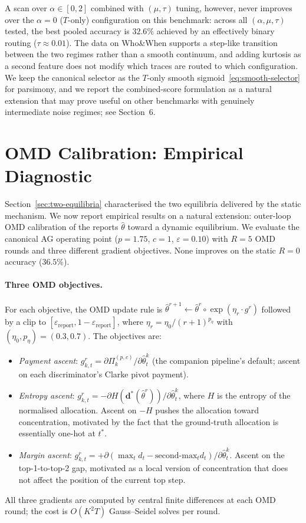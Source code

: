 \documentclass[11pt]{article}
\newcommand{\thetahat}{\hat{\theta}}
\newcommand{\db}{\bm{d}}
\begin{document}
A scan over $\alpha \in [0, 2]$ combined with $(\mu, \tau)$ tuning,
however, never improves over the $\alpha = 0$ ($T$-only) configuration on
this benchmark: across all $(\alpha, \mu, \tau)$ tested, the best pooled
accuracy is $32.6\%$ achieved by an effectively binary routing
($\tau \approx 0.01$). The data on Who\&When supports a step-like
transition between the two regimes rather than a smooth continuum, and
adding kurtosis as a second feature does not modify which traces are
routed to which configuration. We keep the canonical selector as the
$T$-only smooth sigmoid~\eqref{eq:smooth-selector} for parsimony, and we
report the combined-score formulation as a natural extension that may
prove useful on other benchmarks with genuinely intermediate noise
regimes; see Section~6.

\section{OMD Calibration: Empirical Diagnostic}
\label{sec:omd-diagnostic}

Section~\ref{sec:two-equilibria} characterised the two equilibria delivered
by the static mechanism. We now report empirical results on a natural
extension: outer-loop OMD calibration of the reports $\thetahat$ toward a
dynamic equilibrium. We evaluate the canonical AG operating point
($p = 1.75$, $c = 1$, $\varepsilon = 0.10$) with $R = 5$ OMD rounds and
three different gradient objectives. None improves on the static
$R = 0$ accuracy ($36.5\%$).

\paragraph{Three OMD objectives.}
For each objective, the OMD update rule is
$\thetahat^{r+1} \gets \thetahat^r \circ \exp(\eta_r \cdot g^r)$
followed by a clip to $[\varepsilon_{\text{report}}, 1 - \varepsilon_{\text{report}}]$,
where $\eta_r = \eta_0 / (r+1)^{p_\eta}$ with $(\eta_0, p_\eta) = (0.3, 0.7)$.
The objectives are:
\begin{itemize}[nosep, leftmargin=*]
\item \emph{Payment ascent}: $g^r_{k, t} = \partial \Pi_k^{(p, c)} / \partial \thetahat^k_t$
(the companion pipeline's default; ascent on each discriminator's Clarke
pivot payment).
\item \emph{Entropy ascent}: $g^r_{k, t} = -\partial H(\db^*(\thetahat^r)) / \partial \thetahat^k_t$,
where $H$ is the entropy of the normalised allocation. Ascent on
$-H$ pushes the allocation toward concentration, motivated by the fact
that the ground-truth allocation is essentially one-hot at $t^*$.
\item \emph{Margin ascent}: $g^r_{k, t} = +\partial (\max_t d_t - \text{second-max}_t d_t) / \partial \thetahat^k_t$.
Ascent on the top-1-to-top-2 gap, motivated as a local version of
concentration that does not affect the position of the current top step.
\end{itemize}
All three gradients are computed by central finite differences at each
OMD round; the cost is $O(K^2 T)$ Gauss--Seidel solves per round.
\end{document}
